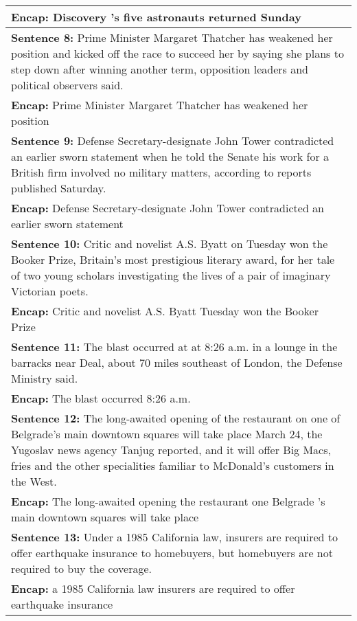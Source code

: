\begin{table}
{\begin{longtable}{|p{16 cm}|}
{\bf Encap:}   Discovery 's five astronauts returned Sunday  \\
\hline
{\bf Sentence 8:} \singlespace  Prime Minister Margaret Thatcher has weakened her position and kicked off the race to succeed her by saying she plans to step down after winning another term, opposition leaders and political observers said.  \\ 
{\bf Encap:}   Prime Minister Margaret Thatcher has weakened her position  \\ \hline
{\bf Sentence 9:} \singlespace  Defense Secretary-designate John Tower contradicted an earlier sworn statement when he told the Senate his work for a British firm involved no military matters, according to reports published Saturday.   \\
{\bf Encap:}   Defense Secretary-designate John Tower contradicted an earlier sworn statement  \\ \hline
{\bf Sentence 10:}  \singlespace Critic and novelist A.S. Byatt on Tuesday won the Booker Prize, Britain's most prestigious literary award, for her tale of two young scholars investigating the lives of a pair of imaginary Victorian poets.   \\
{\bf Encap:}   Critic and novelist A.S. Byatt Tuesday won the Booker Prize  \\ \hline
{\bf Sentence 11:}  \singlespace The blast occurred at at 8:26 a.m. in a lounge in the barracks near Deal, about 70 miles southeast of London, the Defense Ministry said.   \\
{\bf Encap:}   The blast occurred 8:26 a.m.  \\ \hline
{\bf Sentence 12:} \singlespace  The long-awaited opening of the restaurant on one of Belgrade's main downtown squares will take place March 24, the Yugoslav news agency Tanjug reported, and it will offer Big Macs, fries and the other specialities familiar to McDonald's customers in the West.   \\
{\bf Encap:}   The long-awaited opening the restaurant one Belgrade 's main downtown squares will take place  \\ \hline
{\bf Sentence 13:} \singlespace  Under a 1985 California law, insurers are required to offer earthquake insurance to homebuyers, but homebuyers are not required to buy the coverage.   \\
{\bf Encap:}   a 1985 California law insurers are required to offer earthquake insurance  \\ \hline
\end{longtable} }
\label{ch5:sentsur}
\end{table} 